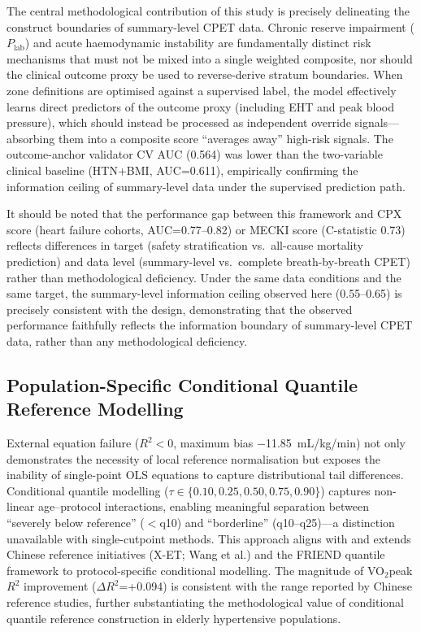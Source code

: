 \documentclass[12pt, a4paper]{article}
\begin{document}
The central methodological contribution of this study is precisely delineating
the construct boundaries of summary-level CPET data. Chronic reserve impairment
($P_{\text{lab}}$) and acute haemodynamic instability are fundamentally distinct
risk mechanisms that must not be mixed into a single weighted composite, nor
should the clinical outcome proxy be used to reverse-derive stratum
boundaries\cite{Ross2024}. When zone definitions are optimised against a
supervised label, the model effectively learns direct predictors of the outcome
proxy (including EHT and peak blood pressure), which should instead be processed
as independent override signals---absorbing them into a composite score
``averages away'' high-risk signals.
The outcome-anchor validator CV AUC (0.564) was lower than the two-variable
clinical baseline (HTN+BMI, AUC=0.611), empirically confirming the information
ceiling of summary-level data under the supervised prediction path.

It should be noted that the performance gap between this framework and CPX
score\cite{Gorodeski2008cpx} (heart failure cohorts, AUC=0.77--0.82) or MECKI
score\cite{MECKI2023} (C-statistic 0.73) reflects differences in target (safety
stratification vs.\ all-cause mortality prediction) and data level (summary-level
vs.\ complete breath-by-breath CPET) rather than methodological deficiency.
Under the same data conditions and the same target, the summary-level information
ceiling observed here (0.55--0.65) is precisely consistent with the design,
demonstrating that the observed performance faithfully reflects the information
boundary of summary-level CPET data, rather than any methodological deficiency.

\subsection{Population-Specific Conditional Quantile Reference Modelling}

External equation failure ($R^2<0$, maximum bias $-$11.85~mL/kg/min) not only
demonstrates the necessity of local reference normalisation but exposes the
inability of single-point OLS equations to capture distributional tail
differences. Conditional quantile modelling
($\tau \in \{0.10, 0.25, 0.50, 0.75, 0.90\}$) captures non-linear
age--protocol interactions, enabling meaningful separation between ``severely
below reference'' ($<$q10) and ``borderline'' (q10--q25)---a distinction
unavailable with single-cutpoint methods.
This approach aligns with and extends Chinese reference initiatives
(X-ET\cite{XET2021}; Wang et al.\cite{WangCycle2022}) and the FRIEND quantile
framework\cite{FRIEND2022} to protocol-specific conditional modelling.
The magnitude of VO$_2$peak $R^2$ improvement ($\Delta R^2$=+0.094) is
consistent with the range reported by Chinese reference studies, further
substantiating the methodological value of conditional quantile reference
construction in elderly hypertensive populations.
\end{document}
